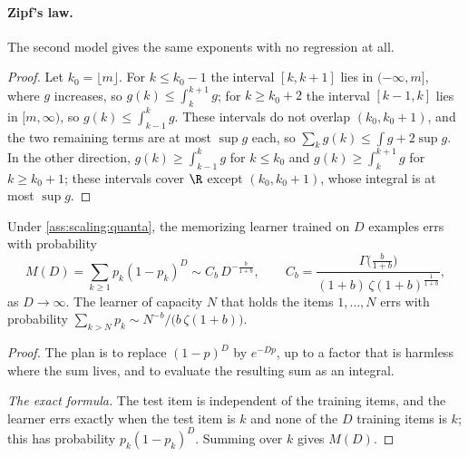 \begin{refsection}
\paragraph{Zipf's law.} The second model gives the same exponents with no regression at all.

\begin{lemma}[Integral of a unimodal sequence]\label[lemma]{lem:scaling:unimodal}
Let $g\colon\R\to[0,\infty)$ be integrable, nondecreasing on $(-\infty,m]$ and nonincreasing on $[m,\infty)$. Then $\bigl\lvert\sum_{k\in\Z}g(k)-\int g\bigr\rvert\le2\sup g$.
\end{lemma}

\begin{proof}
Let $k_0=\lfloor m\rfloor$. For $k\le k_0-1$ the interval $[k,k+1]$ lies in $(-\infty,m]$, where $g$ increases, so $g(k)\le\int_k^{k+1}g$; for $k\ge k_0+2$ the interval $[k-1,k]$ lies in $[m,\infty)$, so $g(k)\le\int_{k-1}^kg$. These intervals do not overlap $(k_0,k_0+1)$, and the two remaining terms are at most $\sup g$ each, so $\sum_kg(k)\le\int g+2\sup g$. In the other direction, $g(k)\ge\int_{k-1}^kg$ for $k\le k_0$ and $g(k)\ge\int_k^{k+1}g$ for $k\ge k_0+1$; these intervals cover $\R$ except $(k_0,k_0+1)$, whose integral is at most $\sup g$.
\end{proof}

\begin{theorem}\label{thm:scaling:zipf}
Under \cref{ass:scaling:quanta}, the memorizing learner trained on $D$ examples errs with probability
\begin{equation}\label{eq:scaling:zipfexact}
  M(D)=\sum_{k\ge1}p_k(1-p_k)^D\sim C_b\,D^{-\frac b{1+b}},\qquad C_b=\frac{\Gamma\bigl(\frac b{1+b}\bigr)}{(1+b)\,\zeta(1+b)^{\frac1{1+b}}},
\end{equation}
as $D\to\infty$. The learner of capacity $N$ that holds the items $1,\dots,N$ errs with probability $\sum_{k>N}p_k\sim N^{-b}/\bigl(b\,\zeta(1+b)\bigr)$.
\end{theorem}

\begin{proof}
The plan is to replace $(1-p)^D$ by $e^{-Dp}$, up to a factor that is harmless where the sum lives, and to evaluate the resulting sum as an integral.

\emph{The exact formula.} The test item is independent of the training items, and the learner errs exactly when the test item is $k$ and none of the $D$ training items is $k$; this has probability $p_k(1-p_k)^D$. Summing over $k$ gives $M(D)$.


\end{proof}
\end{refsection}
